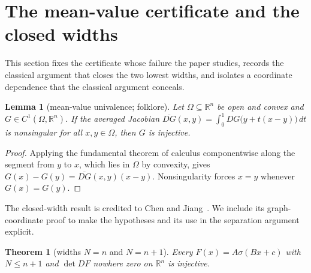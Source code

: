 \documentclass[11pt,twoside,leqno]{article}
\theoremstyle{plain}
\newtheorem{theorem}{Theorem}[section]
\newtheorem{lemma}[lemma]{Lemma}
\theoremstyle{definition}
\theoremstyle{remark}
\newcommand{\R}{\mathbb{R}}
\begin{document}
\section{The mean-value certificate and the closed widths}\label{sec:closedwidth}

This section fixes the certificate whose failure the paper studies, records the
classical argument that closes the two lowest widths, and isolates a
coordinate dependence that the classical argument conceals.

\begin{lemma}[mean-value univalence; folklore]\label{lem:mv}
Let $\Omega\subseteq\R^n$ be open and convex and $G\in C^1(\Omega,\R^n)$.  If
the averaged Jacobian
$\overline{DG}(x,y)=\int_0^1 DG\bigl(y+t(x-y)\bigr)\,dt$
is nonsingular for all $x,y\in\Omega$, then $G$ is injective.
\end{lemma}

\begin{proof}
Applying the fundamental theorem of calculus componentwise along the segment
from $y$ to $x$, which lies in $\Omega$ by convexity, gives
$G(x)-G(y)=\overline{DG}(x,y)(x-y)$.  Nonsingularity forces $x=y$ whenever
$G(x)=G(y)$.
\end{proof}

The closed-width result is credited to Chen and Jiang~\cite{chen-jiang}.
We include its graph-coordinate proof to make the hypotheses and its use in
the separation argument explicit.

\begin{theorem}[widths $N=n$ and $N=n+1$]\label{thm:closedwidths}
Every $F(x)=A\sigma(Bx+c)$ with $N\le n+1$ and $\det DF$ nowhere zero on
$\R^n$ is injective.
\end{theorem}
\end{document}
